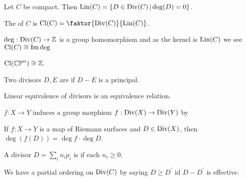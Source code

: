 \documentclass{article}
\begin{document}
\begin{prop}
	Let $C$ be compact. Then $\operatorname{Lin}(C) = \left\{ D \in \operatorname{Div}(C) \, | \deg(D) = 0 \right\}$. 
\end{prop}

\begin{definition}
	The  of $C$ is $\Cl(C) = \faktor{\Div(C)}{\Lin(C)}$.
\end{definition}

\begin{remark}
	$\deg: \operatorname{Div}(C) \to \mathbb{Z}$ is a group homomorphism and as the kernel is $\operatorname{Lin}(C)$ we see $\operatorname{Cl}(C) \cong \operatorname{Im} \deg$
\end{remark}
\begin{corollary}
	$\operatorname{Cl}(\mathbb{CP}^n) \cong \mathbb{Z}$. 
\end{corollary}

\begin{definition}
	Two divisors $D,E$ are  if $D-E$ is a principal.
\end{definition}

\begin{lemma}
	Linear equivalence of divisors is an equivalence relation. 
\end{lemma}

\begin{lemma}
	$f:X \to Y$ induces a group morphism $f:\operatorname{Div}(X) \to \operatorname{Div}(Y)$ by 
\end{lemma}

\begin{prop}
	If $f:X \to Y$ is a map of Riemann surfaces and $D \in \operatorname{Div}(X)$, then $\deg(f(D)) = \deg f \cdot \deg D$.
\end{prop}

\begin{definition}
	A divisor $D = \sum_i n_i p_i$ is  if each $n_i \geq0$.  
\end{definition}

\begin{prop}
	We have a partial ordering on $\operatorname{Div}(C)$ by saying $D\geq D^\prime$ id $D-D^\prime$ is effective. 
\end{prop}

\end{document}
